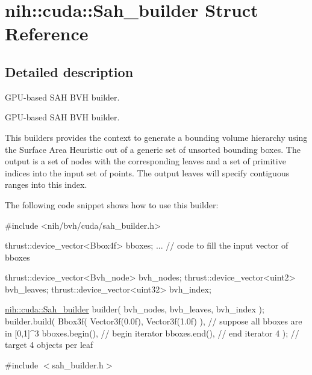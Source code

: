 \hypertarget{structnih_1_1cuda_1_1_sah__builder}{}\section{nih\+:\+:cuda\+:\+:Sah\+\_\+builder Struct Reference}
\label{structnih_1_1cuda_1_1_sah__builder}


\subsection{Detailed description}
G\+P\+U-\/based S\+AH B\+VH builder. 

G\+P\+U-\/based S\+AH B\+VH builder.

This builders provides the context to generate a bounding volume hierarchy using the Surface Area Heuristic out of a generic set of unsorted bounding boxes. The output is a set of nodes with the corresponding leaves and a set of primitive indices into the input set of points. The output leaves will specify contiguous ranges into this index.

The following code snippet shows how to use this builder\+:


\begin{DoxyCode}
\textcolor{preprocessor}{#include <nih/bvh/cuda/sah\_builder.h>}

thrust::device\_vector<Bbox4f>   bboxes;
... \textcolor{comment}{// code to fill the input vector of bboxes}

thrust::device\_vector<Bvh\_node> bvh\_nodes;
thrust::device\_vector<uint2>    bvh\_leaves;
thrust::device\_vector<uint32>   bvh\_index;

\hyperlink{structnih_1_1cuda_1_1_sah__builder}{nih::cuda::Sah\_builder} builder( bvh\_nodes, bvh\_leaves, bvh\_index );
builder.build(
    Bbox3f( Vector3f(0.0f), Vector3f(1.0f) ),   \textcolor{comment}{// suppose all bboxes are in [0,1]^3}
    bboxes.begin(),                             \textcolor{comment}{// begin iterator}
    bboxes.end(),                               \textcolor{comment}{// end iterator}
    4 );                                        \textcolor{comment}{// target 4 objects per leaf}
\end{DoxyCode}
 

{\ttfamily \#include $<$sah\+\_\+builder.\+h$>$}

